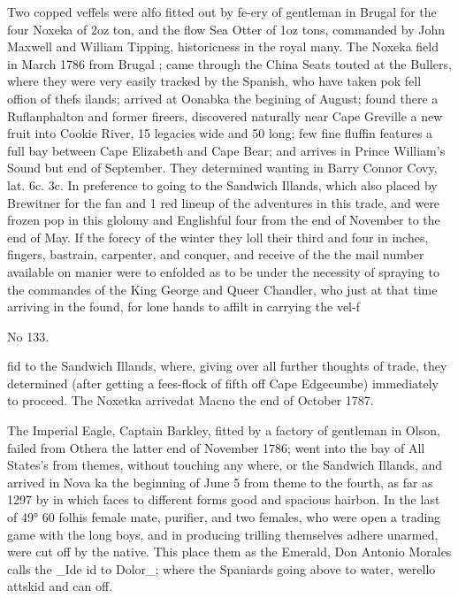 Two copped veffels were alfo fitted out by fe-ery of gentleman in Brugal for the four Noxeka of 2oz ton, and the flow Sea Otter of 1oz tons, commanded by John Maxwell and William Tipping, historicness in the royal many. The Noxeka field in March 1786 from Brugal ; came through the China Seats touted at the Bullers, where they were very easily tracked by the Spanish, who have taken pok fell offion of thefs ilands; arrived at Oonabka the begining of August; found there a Ruflanphalton and former fireers, discovered naturally near Cape Greville a new fruit into Cookie River, 15 legacies wide and 50 long; few fine fluffin features a full bay between Cape Elizabeth and Cape Bear; and arrives in Prince William's Sound but end of September. They determined wanting in Barry Connor Covy, lat. 6c. 3c. In preference to going to the Sandwich Illands, which also placed by Brewitner for the fan and 1 red lineup of the adventures in this trade, and were frozen pop in this glolomy and Englishful four from the end of November to the end of May. If the forecy of the winter they loll their third and four in inches, fingers, bastrain, carpenter, and conquer, and receive of the the mail number available on manier were to enfolded as to be under the necessity of spraying to the commandes of the King George and Queer Chandler, who just at that time arriving in the found, for lone hands to affilt in carrying the vel-f\par\medskip
No 133.\par\medskip
fid to the Sandwich Illands, where, giving over all further thoughts of trade, they determined (after getting a fees-flock of fifth off Cape Edgecumbe) immediately to proceed. The Noxetka arrivedat Macno the end of October 1787.\par\medskip
The Imperial Eagle, Captain Barkley, fitted by a factory of gentleman in Olson, failed from Othera the latter end of November 1786; went into the bay of All States’s from themes, without touching any where, or the Sandwich Illands, and arrived in Nova ka the beginning of June 5 from theme to the fourth, as far as 1297 by in which faces to different forms good and spacious hairbon. In the last of 49° 60 folhis female mate, purifier, and two females, who were open a trading game with the long boys, and in producing trilling themselves adhere unarmed, were cut off by the native. This place them as the Emerald, Don Antonio Morales calls the \_Ide id to Dolor\_; where the Spaniards going above to water, werello attskid and can off.\par\medskip
